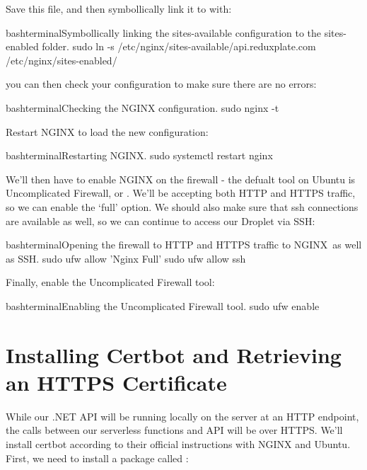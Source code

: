 \documentclass[a4paper,headinclude=on,footinclude=on,12pt,oneside]{scrbook}
\begin{document}
Save this file, and then symbollically link it to  with:

\begin{codeInput}{bash}{terminal}{Symbollically linking the sites-available configuration to the sites-enabled folder.}
sudo ln -s /etc/nginx/sites-available/api.reduxplate.com /etc/nginx/sites-enabled/
\end{codeInput}

you can then check your configuration to make sure there are no errors:

\begin{codeInput}{bash}{terminal}{Checking the NGINX configuration.}
sudo nginx -t
\end{codeInput}

Restart NGINX to load the new configuration:

\begin{codeInput}{bash}{terminal}{Restarting NGINX.}
sudo systemctl restart nginx
\end{codeInput}

We'll then have to enable NGINX on the firewall - the defualt tool on Ubuntu is Uncomplicated Firewall, or . We'll be accepting both HTTP and HTTPS traffic, so we can enable the `full' option. We should also make sure that ssh connections are available as well, so we can continue to access our Droplet via SSH:

\begin{codeInput}{bash}{terminal}{Opening the firewall to HTTP and HTTPS traffic to NGINX\, as well as SSH.}
sudo ufw allow 'Nginx Full'
sudo ufw allow ssh
\end{codeInput}

Finally, enable the Uncomplicated Firewall tool:

\begin{codeInput}{bash}{terminal}{Enabling the Uncomplicated Firewall tool.}
sudo ufw enable
\end{codeInput}

\section{Installing Certbot and Retrieving an HTTPS Certificate}

While our .NET API will be running locally on the server at an HTTP endpoint, the calls between our serverless functions and API will be over HTTPS. We'll install certbot according to their official instructions with NGINX and Ubuntu. First, we need to install a package called :
\end{document}
